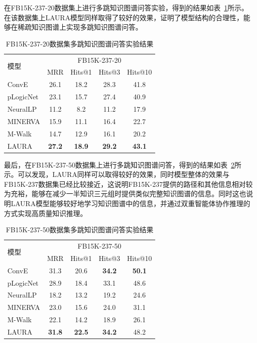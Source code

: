 \documentclass[algorithmlist, AutoFakeBold, AutoFakeSlant, figurelist, tablelist, nomlist, masters]{seuthesix}
\begin{document}
在FB15K-237-20数据集上进行多跳知识图谱问答实验，得到的结果如表~\ref{Experiment2_FB15K-237-20}所示。在该数据集上LAURA模型同样取得了较好的效果，证明了模型结构的合理性，能够在稀疏知识图谱上实现多跳知识图谱问答。
\begin{table}[]
  \centering
  \begin{tabular*}{0.95\textwidth}{@{\extracolsep{\fill}}lcccc}
  \toprule[1pt]
  \multirow{2}{*}{模型} & \multicolumn{4}{c}{FB15K-237-20}   \\
    & MRR & Hits@1 & Hits@3 & Hits@10 \\ \hline
  ConvE & 26.1 & 18.2 & 28.3 & 41.8 \\
  pLogicNet & 23.1 & 15.7 & 27.4 & 40.9 \\
  NeuralLP & 11.2 & 8.2 & 11.2 & 17.9 \\
  MINERVA & 15.9 & 11.1 & 16.4 & 22.7 \\
  M-Walk & 14.7 & 12.9 & 16.1 & 20.2 \\
  LAURA & \textbf{27.2} & \textbf{18.9} & \textbf{29.2} & \textbf{43.1} \\
  \bottomrule[1pt]
  \end{tabular*}
  \caption{FB15K-237-20数据集多跳知识图谱问答实验结果}
  \label{Experiment2_FB15K-237-20}
\end{table}

最后，在FB15K-237-50数据集上进行多跳知识图谱问答，得到的结果如表~\ref{Experiment2_FB15K-237-50}所示。可以发现，LAURA同样可以取得较好的效果，同时模型整体的效果与FB15K-237数据集已经比较接近，这说明FB15K-237提供的路径和其他信息相对较为充裕，能够在减少一半知识三元组时提供类似完整知识图谱的信息。同时这也说明LAURA模型能够较好地学习知识图谱中的信息，并通过双重智能体协作推理的方式实现高质量知识推理。
\begin{table}[]
  \centering
  \begin{tabular*}{0.95\textwidth}{@{\extracolsep{\fill}}lcccc}
  \toprule[1pt]
  \multirow{2}{*}{模型} & \multicolumn{4}{c}{FB15K-237-50}   \\
    & MRR & Hits@1 & Hits@3 & Hits@10 \\ \hline
  ConvE & 31.3 & 20.6 & \textbf{34.2} & \textbf{50.1} \\
  pLogicNet & 28.9 & 18.4 & 33.1 & 48.6 \\
  NeuralLP & 18.2 & 13.2 & 19.2 & 24.6 \\
  MINERVA & 23.0 & 15.6 & 24.0 & 31.1 \\
  M-Walk & 22.1 & 14.2 & 18.9 & 26.1 \\
  LAURA & \textbf{31.8} & \textbf{22.5} & \textbf{34.2} & 48.2 \\
  \bottomrule[1pt]
  \end{tabular*}
  \caption{FB15K-237-50数据集多跳知识图谱问答实验结果}
  \label{Experiment2_FB15K-237-50}
\end{table}
\end{document}
